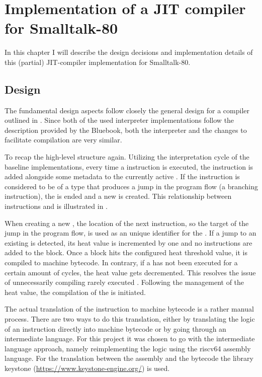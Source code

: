 \chapter{Implementation of a JIT compiler for Smalltalk-80}
In this chapter I will describe the design decisions and implementation details of this (partial) JIT-compiler implementation for Smalltalk-80.
\section{Design}
The fundamental design aspects follow closely the general design for a \jit{} compiler outlined in .
Since both of the used interpreter implementations follow the description provided by the Bluebook, both the interpreter and the changes to facilitate \jit{} compilation are very similar. 

To recap the high-level structure again. Utilizing the interpretation cycle of the baseline implementations, every time a instruction is executed, the instruction is added alongside some metadata to the currently active \bb{}. If the instruction is considered to be of a type that produces a jump in the program flow (a branching instruction), the \bb{} is ended and a new \bb{} is created. This relationship between instructions and \bbs{} is illustrated in . 


When creating a new \bb{}, the location of the next instruction, so the target of the jump in the program flow, is used as an unique identifier for the \bb{}. 
If a jump to an existing \bb{} is detected, its heat value is incremented by one and no instructions are added to the block. 
Once a block hits the configured heat threshold value, it is compiled to machine bytecode. In contrary, if a \bb{} has not been executed for a certain amount of cycles, the heat value gets decremented. This resolves the issue of unnecessarily compiling rarely executed \bbs{}. 
Following the management of the heat value, the compilation of the \bb{} is initiated.

The actual translation of the instruction to machine bytecode is a rather manual process. There are two ways to do this translation, either by translating the logic of an instruction directly into machine bytecode or by going through an intermediate language. For this project it was chosen to go with the intermediate language approach, namely reimplementing the logic using the riscv64 assembly language. For the translation between the assembly and the bytecode the library keystone (\url{https://www.keystone-engine.org/}) is used.

